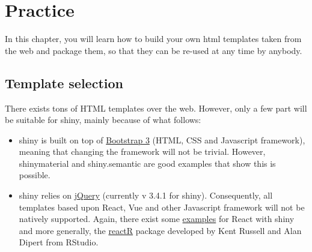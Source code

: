 \documentclass[]{book}
\newenvironment{Shaded}{\begin{snugshade}}{\end{snugshade}}
\newcommand{\DataTypeTok}[1]{\textcolor[rgb]{0.13,0.29,0.53}{#1}}
\newcommand{\KeywordTok}[1]{\textcolor[rgb]{0.13,0.29,0.53}{\textbf{#1}}}
\newcommand{\NormalTok}[1]{#1}
\newcommand{\OperatorTok}[1]{\textcolor[rgb]{0.81,0.36,0.00}{\textbf{#1}}}
\newcommand{\StringTok}[1]{\textcolor[rgb]{0.31,0.60,0.02}{#1}}
\providecommand{\tightlist}{%
  \setlength{\itemsep}{0pt}\setlength{\parskip}{0pt}}
\begin{document}
\begin{Shaded}
\end{Shaded}

\hypertarget{part-practice}{%
\part*{Practice}\label{part-practice}}

In this chapter, you will learn how to build your own html templates taken from the web and package them, so that they can be re-used at any time by anybody.

\hypertarget{custom-templates-selection}{%
\chapter{Template selection}\label{custom-templates-selection}}

There exists tons of HTML templates over the web. However, only a few part will be suitable for shiny, mainly because of what follows:

\begin{itemize}
\tightlist
\item
  shiny is built on top of \href{https://getbootstrap.com/docs/3.3/}{Bootstrap 3} (HTML, CSS and Javascript framework), meaning that changing the framework will not be trivial. However, shinymaterial and shiny.semantic are good examples that show this is possible.
\item
  shiny relies on \href{https://jquery.com}{jQuery} (currently v 3.4.1 for shiny). Consequently, all templates based upon React, Vue and other Javascript framework will not be natively supported. Again, there exist some \href{https://github.com/alandipert/react-widget-demo/blob/master/app.R}{examples} for React with shiny and more generally,
  the \href{https://react-r.github.io/reactR/}{reactR} package developed by Kent Russell and Alan Dipert from RStudio.
\end{itemize}
\end{document}
